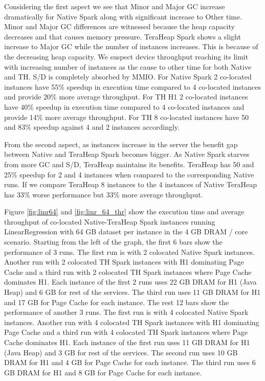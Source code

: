 Considering the first aspect we see that Minor and Major GC increase dramatically for Native Spark along with significant increase to Other time. Minor and Major GC differences are witnessed because the heap capacity decreases and that causes memory pressure. TeraHeap Spark shows a slight increase to Major GC while the number of instances increases. This is because of the decreasing heap capacity. We suspect device throughput reaching its limit with increasing number of instances as the cause to other time for both Native and TH. S/D is completely absorbed by MMIO. For Native Spark 2 co-located instances have 55\% speedup in execution time compared to 4 co-located instances and provide 20\% more average throughput. For TH H1 2 co-located instances have 40\% speedup in execution time compared to 4 co-located instances and provide 14\% more average throughput. For TH 8 co-located instances have 50 and 83\% speedup against 4 and 2 instances accordingly.

From the second aspect, as instances increase in the server the benefit gap between Native and TeraHeap Spark becomes bigger. As Native Spark starves from more GC and S/D, TeraHeap maintains its benefits. TeraHeap has 50 and 25\% speedup for 2 and 4 instances when compared to the corresponding Native runs. If we compare TeraHeap 8 instances to the 4 instances of Native TeraHeap has 33\% worse performance but 33\% more average throughput.

Figure \ref{fig:linr64} and \ref{fig:linr_64_thr} show the execution time and average throughput of co-located
Native-TeraHeap Spark instances running LinearRegression with 64 GB
dataset per instance in the 4 GB DRAM / core scenario.
Starting from the left of the graph, the first 6 bars show the
performance of 3 runs. The first run is with 2 colocated Native Spark instances.
Another run with 2 colocated TH Spark instances with H1 dominating Page Cache
and a third run with 2 colocated TH Spark instances where Page Cache dominates H1.
Each instance of the first 2 runs uses 22 GB DRAM for H1 (Java Heap) and 6 GB for rest of the services.
The third run uses 11 GB DRAM for H1 and 17 GB for Page Cache for each instance.
The rest 12 bars show the performance of another 3 runs. The first run is with 4 colocated Native Spark instances.
Another run with 4 colocated TH Spark instances with H1 dominating Page Cache
and a third run with 4 colocated TH Spark instances where Page Cache dominates H1.
Each instance of the first run uses 11 GB DRAM for H1 (Java Heap) and 3 GB for rest of the services.
The second run uses 10 GB DRAM for H1 and 4 GB for Page Cache for each instance.
The third run uses 6 GB DRAM for H1 and 8 GB for Page Cache for each instance.

